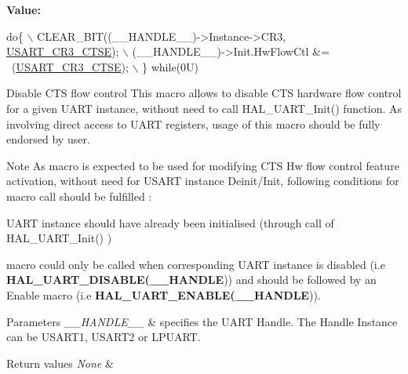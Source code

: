 {\bfseries Value\+:}
\begin{DoxyCode}
\textcolor{keywordflow}{do}\{                                                       \(\backslash\)
    CLEAR\_BIT((\_\_HANDLE\_\_)->Instance->CR3, \mbox{\hyperlink{group___peripheral___registers___bits___definition_gaa125f026b1ca2d76eab48b191baed265}{USART\_CR3\_CTSE}}); \(\backslash\)
    (\_\_HANDLE\_\_)->Init.HwFlowCtl &= ~(\mbox{\hyperlink{group___peripheral___registers___bits___definition_gaa125f026b1ca2d76eab48b191baed265}{USART\_CR3\_CTSE}});      \(\backslash\)
  \} \textcolor{keywordflow}{while}(0U)
\end{DoxyCode}


Disable C\+TS flow control This macro allows to disable C\+TS hardware flow control for a given U\+A\+RT instance, without need to call H\+A\+L\+\_\+\+U\+A\+R\+T\+\_\+\+Init() function. As involving direct access to U\+A\+RT registers, usage of this macro should be fully endorsed by user. 

\begin{DoxyNote}{Note}
As macro is expected to be used for modifying C\+TS Hw flow control feature activation, without need for U\+S\+A\+RT instance Deinit/\+Init, following conditions for macro call should be fulfilled \+:
\begin{DoxyItemize}
\item U\+A\+RT instance should have already been initialised (through call of H\+A\+L\+\_\+\+U\+A\+R\+T\+\_\+\+Init() )
\item macro could only be called when corresponding U\+A\+RT instance is disabled (i.\+e {\bfseries H\+A\+L\+\_\+\+U\+A\+R\+T\+\_\+\+D\+I\+S\+A\+B\+LE(\+\_\+\+\_\+\+H\+A\+N\+D\+LE})) and should be followed by an Enable macro (i.\+e {\bfseries H\+A\+L\+\_\+\+U\+A\+R\+T\+\_\+\+E\+N\+A\+B\+LE(\+\_\+\+\_\+\+H\+A\+N\+D\+LE})). 
\end{DoxyItemize}
\end{DoxyNote}

\begin{DoxyParams}{Parameters}
{\em \+\_\+\+\_\+\+H\+A\+N\+D\+L\+E\+\_\+\+\_\+} & specifies the U\+A\+RT Handle. The Handle Instance can be U\+S\+A\+R\+T1, U\+S\+A\+R\+T2 or L\+P\+U\+A\+RT. \\
\hline
\end{DoxyParams}

\begin{DoxyRetVals}{Return values}
{\em None} & \\
\hline
\end{DoxyRetVals}
\mbox{\label{group___u_a_r_t___exported___macros_ga4a77213945844bca4c22ba6a14b7ee4c}} 
